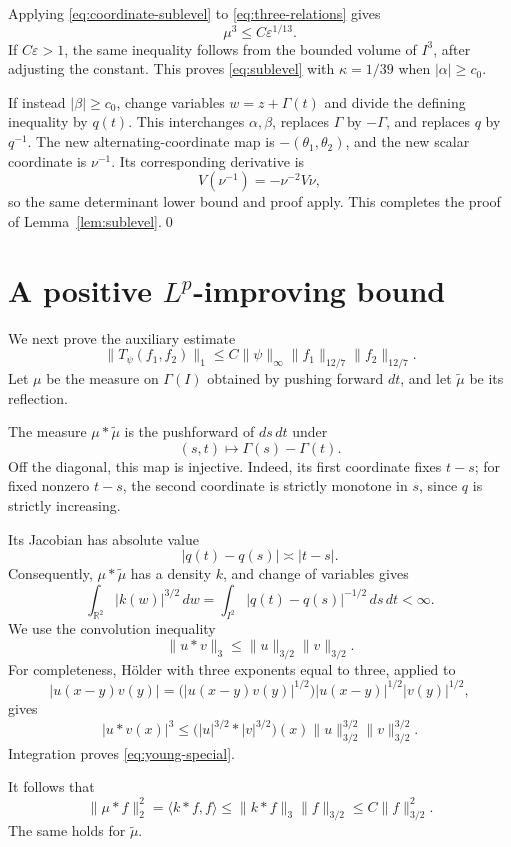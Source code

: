 \documentclass[11pt,a4paper]{article}
\newcommand{\R}{\mathbb R}
\begin{document}
Applying \eqref{eq:coordinate-sublevel} to \eqref{eq:three-relations} gives
\[
\mu^3\leq C\varepsilon^{1/13}.
\]
If $C\varepsilon>1$, the same inequality follows from the bounded volume
of $I^3$, after adjusting the constant. This proves \eqref{eq:sublevel}
with $\kappa=1/39$ when $|\alpha|\geq c_0$.

If instead $|\beta|\geq c_0$, change variables $w=z+\Gamma(t)$ and divide
the defining inequality by $q(t)$. This interchanges $\alpha,\beta$,
replaces $\Gamma$ by $-\Gamma$, and replaces $q$ by $q^{-1}$. The new
alternating-coordinate map is $-(\theta_1,\theta_2)$, and the new scalar
coordinate is $\nu^{-1}$. Its corresponding derivative is
\[
V(\nu^{-1})=-\nu^{-2}V\nu,
\]
so the same determinant lower bound and proof apply. This completes the
proof of Lemma~\ref{lem:sublevel}.\qed

\section{A positive \texorpdfstring{$L^p$}{Lp}-improving bound}

We next prove the auxiliary estimate
\[
\|T_\psi(f_1,f_2)\|_1
\leq C\|\psi\|_\infty
\|f_1\|_{12/7}\|f_2\|_{12/7}.
\tag{4.1}\label{eq:improving}
\]
Let $\mu$ be the measure on $\Gamma(I)$ obtained by pushing forward $dt$,
and let $\widetilde\mu$ be its reflection.

The measure $\mu*\widetilde\mu$ is the pushforward of $ds\,dt$ under
\[
(s,t)\longmapsto\Gamma(s)-\Gamma(t).
\]
Off the diagonal, this map is injective. Indeed, its first coordinate
fixes $t-s$; for fixed nonzero $t-s$, the second coordinate is strictly
monotone in $s$, since $q$ is strictly increasing.

Its Jacobian has absolute value
\[
|q(t)-q(s)|\asymp|t-s|.
\]
Consequently, $\mu*\widetilde\mu$ has a density $k$, and change of variables
gives
\[
\int_{\R^2}|k(w)|^{3/2}\,dw
=\int_{I^2}|q(t)-q(s)|^{-1/2}\,ds\,dt<\infty.
\tag{4.2}\label{eq:difference-density}
\]
We use the convolution inequality
\[
\|u*v\|_3\leq\|u\|_{3/2}\|v\|_{3/2}.
\tag{4.3}\label{eq:young-special}
\]
For completeness, H\"older with three exponents equal to three, applied to
\[
|u(x-y)v(y)|
=\bigl(|u(x-y)v(y)|^{1/2}\bigr)
|u(x-y)|^{1/2}|v(y)|^{1/2},
\]
gives
\[
|u*v(x)|^3
\leq\bigl(|u|^{3/2}*|v|^{3/2}\bigr)(x)
\|u\|_{3/2}^{3/2}\|v\|_{3/2}^{3/2}.
\]
Integration proves \eqref{eq:young-special}.

It follows that
\[
\|\mu*f\|_2^2=\langle k*f,f\rangle
\leq\|k*f\|_3\|f\|_{3/2}
\leq C\|f\|_{3/2}^2.
\tag{4.4}\label{eq:curve-convolution}
\]
The same holds for $\widetilde\mu$.
\end{document}

